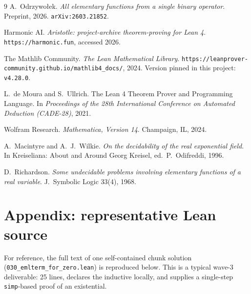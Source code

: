 \documentclass[11pt,a4paper]{article}
\theoremstyle{plain}
\theoremstyle{definition}
\begin{document}

\begin{thebibliography}{9}
A.~Odrzywo\l{}ek.
\newblock \emph{All elementary functions from a single binary operator}.
\newblock Preprint, 2026.
\newblock \texttt{arXiv:2603.21852}.

Harmonic AI.
\newblock \emph{Aristotle: project-archive theorem-proving for Lean 4}.
\newblock \texttt{https://harmonic.fun}, accessed 2026.

The Mathlib Community.
\newblock \emph{The Lean Mathematical Library}.
\newblock \texttt{https://leanprover-community.github.io/mathlib4\_docs/},
2024.  Version pinned in this project: \texttt{v4.28.0}.

L.~de Moura and S.~Ullrich.
\newblock The Lean 4 Theorem Prover and Programming Language.
\newblock In \emph{Proceedings of the 28th International Conference on
Automated Deduction (CADE-28)}, 2021.

Wolfram Research.
\newblock \emph{Mathematica, Version 14}.
\newblock Champaign, IL, 2024.

A.~Macintyre and A.~J.~Wilkie.
\newblock \emph{On the decidability of the real exponential field}.
\newblock In Kreiseliana: About and Around Georg Kreisel, ed.~P.~Odifreddi,
1996.

D.~Richardson.
\newblock \emph{Some undecidable problems involving elementary functions
of a real variable}.
\newblock J.~Symbolic Logic 33(4), 1968.
\end{thebibliography}

\appendix

\section{Appendix: representative Lean source}\label{app:lean}

For reference, the full text of one self-contained chunk solution
(\texttt{030\_emlterm\_for\_zero.lean}) is reproduced below.  This is a
typical wave-3 deliverable: 25 lines, declares the inductive locally,
and supplies a single-step \texttt{simp}-based proof of an
existential.
\end{document}
